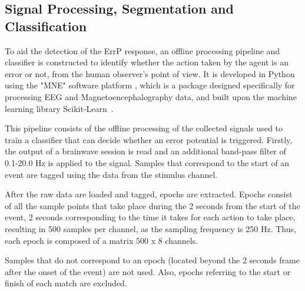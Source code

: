 \documentclass[journal]{IEEEtran}
\begin{document}
{%


\subsection{Signal Processing, Segmentation and Classification}
\label{section:calibration}

To aid the detection of the ErrP response, an offline processing pipeline and classifier is constructed to identify whether the action taken by the agent is an error or not, from the human observer's point of view. It is developed in Python using the "MNE" software platform \cite{MNE-PYTHON}, which is a package designed specifically for processing EEG and Magnetoencephalography data, and built upon the machine learning library Scikit-Learn~\cite{scikit-learn}.

This pipeline consists of the offline processing of the collected signals used to train a classifier that can decide whether an error potential is triggered. Firstly, the output of a brainwave session is read and an additional band-pass filter of 0.1-20.0 Hz is applied to the signal. Samples that correspond to the start of an event are tagged using the data from the stimulus channel.

After the raw data are loaded and tagged, epochs are extracted. Epochs consist of all the sample points that take place during the 2 seconds from the start of the event, 2 seconds corresponding to the time it takes for each action to take place, resulting in 500 samples per channel, as the sampling frequency is 250 Hz. Thus, each epoch is composed of a matrix $500$ x $8$ channels.

Samples that do not correspond to an epoch (located beyond the 2 seconds frame after the onset of the event) are not used. Also, epochs referring to the start or finish of each match are excluded.

}
\end{document}

